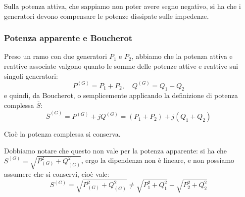 \documentclass[a4paper,11pt]{article}
\begin{document}
Sulla potenza attiva, che sappiamo non poter avere segno negativo, si ha che i generatori devono compensare le potenze dissipate sulle impedenze.

\subsubsection{Potenza apparente e Boucherot}
Preso un ramo con due generatori $P_1$ e $P_2$, abbiamo che la potenza attiva e reattive associate valgono quanto le somme delle potenze attive e reattive sui singoli generatori:
$$
P^{(G)} = P_1 + P_2, \quad Q^{(G)} = Q_1 + Q_2 
$$
e quindi, da Boucherot, o semplicemente applicando la definizione di potenza complessa $\overline{S}$:
$$
\overline{S}^{(G)} = P^{(G)} + j Q^{(G)} = (P_1 + P_2) + j (Q_1 + Q_2)
$$

Cioè la potenza complessa si conserva.

Dobbiamo notare che questo non vale per la potenza apparente: si ha che $S^{(G)} = \sqrt{P_{(G)}^2 + Q_{(G)}^2}$, ergo la dipendenza non è lineare, e non possiamo assumere che si conservi, cioè vale:
$$
S^{(G)} = \sqrt{P_{(G)}^2 + Q_{(G)}^2} \neq \sqrt{P_1^2 + Q_1^2} + \sqrt{P_2^2 + Q_2^2} 
$$
\end{document}
